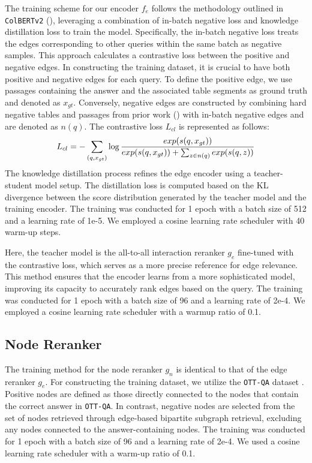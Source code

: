 The training scheme for our encoder $f_{e}$ follows the methodology outlined in \texttt{ColBERTv2} (\citealt{ColBERTv2}), leveraging a combination of in-batch negative loss and knowledge distillation loss to train the model. 
Specifically, the in-batch negative loss treats the edges corresponding to other queries within the same batch as negative samples.
This approach calculates a contrastive loss between the positive and negative edges.
In constructing the training dataset, it is crucial to have both positive and negative edges for each query. 
To define the positive edge, we use passages containing the answer and the associated table segments as ground truth and denoted as $x_{gt}$.
Conversely, negative edges are constructed by combining hard negative tables and passages from prior work (\citealt{COS}) with in-batch negative edges and are denoted as $n(q)$.
The contrastive loss $L_{cl}$ is represented as follows:
\begin{equation}
\small
    L_{cl} = - \sum_{(q,x_{gt})}\log{\frac{exp(s(q,x_{gt}))}{exp(s(q,x_{gt}))+\sum_{z\in n(q)}exp(s(q,z))}}
\end{equation}
\label{eqn:contrastive_loss}
The knowledge distillation process refines the edge encoder using a teacher-student model setup.
The distillation loss is computed based on the KL divergence between the score distribution generated by the teacher model and the training encoder. The training was conducted for 1 epoch with a batch size of 512 and a learning rate of 1e-5. We employed a cosine learning rate scheduler with 40 warm-up steps.

Here, the teacher model is the all-to-all interaction reranker $g_{e}$ fine-tuned with the contrastive loss, which serves as a more precise reference for edge relevance.
This method ensures that the encoder learns from a more sophisticated model, improving its capacity to accurately rank edges based on the query. The training was conducted for 1 epoch with a batch size of 96 and a learning rate of 2e-4. We employed a cosine learning rate scheduler with a warmup ratio of 0.1.



\subsection{Node Reranker}
\label{sec:node_reranker}

The training method for the node reranker $g_n$ is identical to that of the edge reranker $g_e$. 
For constructing the training dataset, we utilize the \texttt{OTT-QA} dataset \citep{OTT-QA}. 
Positive nodes are defined as those directly connected to the nodes that contain the correct answer in \texttt{OTT-QA}. 
In contrast, negative nodes are selected from the set of nodes retrieved through edge-based bipartite subgraph retrieval, excluding any nodes connected to the answer-containing nodes. The training was conducted for 1 epoch with a batch size of 96 and a learning rate of 2e-4. We used a cosine learning rate scheduler with a warm-up ratio of 0.1.


